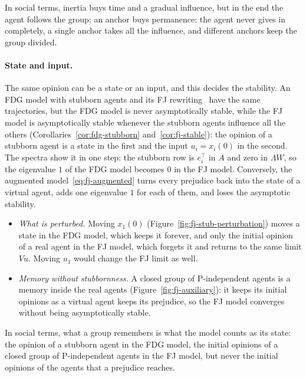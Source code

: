 In social terms, inertia buys time and a gradual influence, but in the end the agent
follows the group; an anchor buys permanence: the agent never gives in completely, a
single anchor takes all the influence, and different anchors keep the group divided.

\paragraph{State and input.}
The same opinion can be a state or an input, and this decides the stability. An FDG
model with stubborn agents and its FJ rewriting~\cite{proskurnikov2017tutorial} have the
same trajectories, but the FDG model is never asymptotically stable, while the FJ model
is asymptotically stable whenever the stubborn agents influence all the others
(Corollaries~\ref{cor:fdg-stubborn} and~\ref{cor:fj-stable}): the opinion
 of a stubborn agent is a state in the
first and the input $u_i = x_i(0)$ in the second. The spectra show it in one step: the
stubborn row is $e_i^\top$ in $A$ and zero in $\Lambda W$, so the eigenvalue $1$ of the
FDG model becomes $0$ in the FJ model. Conversely, the augmented
model~\eqref{eq:fj-augmented} turns every prejudice back into the state of a virtual
agent, adds one eigenvalue $1$ for each of them, and loses the asymptotic stability.
\begin{itemize}
  \item \emph{What is perturbed.} Moving $x_1(0)$ (Figure~\ref{fig:fj-stub-perturbation})
        moves a state in the FDG model, which keeps it forever, and only the initial
        opinion of a real agent in the FJ model, which forgets it and returns to the same
        limit $Vu$. Moving $u_1$ would change the FJ limit as well.
  \item \emph{Memory without stubbornness.} A closed group of P-independent agents is
        a memory inside the real agents (Figure~\ref{fig:fj-auxiliary}): it keeps its
        initial opinions as a virtual agent keeps its prejudice, so the FJ model converges
        without being asymptotically stable.
\end{itemize}
In social terms, what a group remembers is what the model counts as its state: the
opinion of a stubborn agent in the FDG model, the initial opinions of a closed group of
P-independent agents in the FJ model, but never the initial opinions of the agents that a
prejudice reaches.

